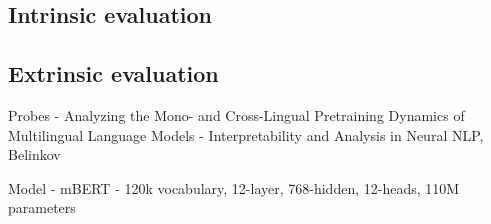 \subsection{Intrinsic evaluation}

\subsection{Extrinsic evaluation}


Probes
- Analyzing the Mono- and Cross-Lingual Pretraining Dynamics of Multilingual Language Models
- Interpretability and Analysis in Neural NLP, Belinkov

Model
- mBERT - 120k vocabulary, 12-layer, 768-hidden, 12-heads, 110M parameters